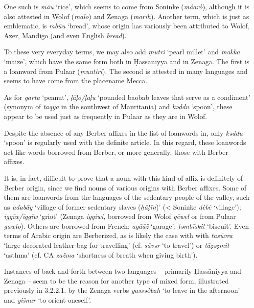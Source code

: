 \documentclass[output=paper]{langsci/langscibook}
\begin{document}
One such is \textit{mā{\R}u} ‘rice’, which seems to come from Soninke (\textit{máarò}), although it is also attested in Wolof (\textit{mālo}) and Zenaga (\textit{mārih}). Another term, which is just as emblematic, is \textit{mbū{\R}u} ‘bread’, whose origin has variously been attributed to Wolof, Azer, Mandigo (and even English \textit{bread}).

To these very everyday terms, we may also add \textit{ṃutri} ‘pearl millet’ and \textit{makka} ‘maize’, which have the same form both in Ḥassāniyya and in Zenaga. The first is a loanword from Pulaar (\textit{muutiri}). The second is attested in many languages and seems to have come from the placename Mecca. 

As for \textit{garta} ‘peanut’, \textit{ḷāḷo/ḷaḷu} ‘pounded baobab leaves that serve as a condiment’ (synonym of \textit{taqya} in the southwest of Mauritania) and \textit{kəddu} ‘spoon’, these appear to be used just as frequently in Pulaar as they are in Wolof. 


Despite the absence of any Berber affixes in the list of loanwords in, only \textit{kəddu} ‘spoon’ is regularly used with the definite article. In this regard, these loanwords act like words borrowed from Berber, or more generally, those with Berber affixes. 

It is, in fact, difficult to prove that a noun with this kind of affix is definitely of Berber origin, since we find nouns of various origins with Berber affixes. Some of them are loanwords from the languages of the sedentary people of the valley, such as \textit{adabāy} ‘village of former sedentary slaves (\textit{ḥ{\R}āṭīn})’ (< Soninke \textit{dèbé} ‘village’); \textit{iggīw/īggīw} ‘griot’ (Zenaga \textit{iggiwi}, borrowed from Wolof \textit{gēwel} or from Pulaar \textit{gawlo}). Others are borrowed from French: \textit{agā{\R}āž} ‘garage’; \textit{təmbīskit} ‘biscuit’. Even terms of Arabic origin are Berberized, as is likely the case with with \textit{tasūvra} ‘large decorated leather bag for travelling’ (cf. \textit{sāvər} ‘to travel’) or \textit{tāẓəẓmît} ‘asthma’ (cf. CA \textit{zažma} ‘shortness of breath when giving birth’).


Instances of back and forth between two languages – primarily Ḥassāniyya and Zenaga – seem to be the reason for another type of mixed form, illustrated previously in 3.2.2.1. by the Zenaga verbs \textit{yassəðbah} ‘to leave in the afternoon’ and \textit{yišnar} ‘to orient oneself’.
\end{document}
